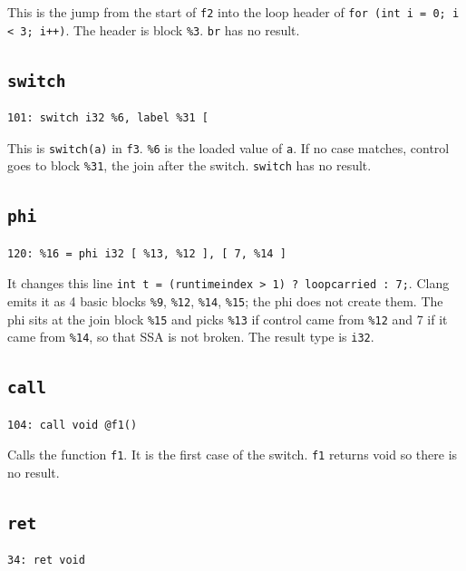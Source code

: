 \documentclass[11pt,a4paper]{article}
\begin{document}
This is the jump from the start of \texttt{f2} into the loop header of
\texttt{for (int i = 0; i < 3; i++)}. The header is block \texttt{\%3}.
\texttt{br} has no result.

\subsection*{\texttt{switch}}

\begin{lstlisting}
101: switch i32 %6, label %31 [
\end{lstlisting}

This is \texttt{switch(a)} in \texttt{f3}. \texttt{\%6} is the loaded
value of \texttt{a}. If no case matches, control goes to block
\texttt{\%31}, the join after the switch. \texttt{switch} has no result.

\subsection*{\texttt{phi}}

\begin{lstlisting}
120: %16 = phi i32 [ %13, %12 ], [ 7, %14 ]
\end{lstlisting}

It changes this line \texttt{int t = (runtimeindex > 1) ? loopcarried : 7;}.
Clang emits it as 4 basic blocks \texttt{\%9}, \texttt{\%12}, \texttt{\%14}, \texttt{\%15}; the phi
does not create them. The phi sits at the join block \texttt{\%15} and picks \texttt{\%13}
if control came from \texttt{\%12} and 7 if it came from \texttt{\%14}, so that SSA is not
broken. The result type is \texttt{i32}.

\subsection*{\texttt{call}}

\begin{lstlisting}
104: call void @f1()
\end{lstlisting}

Calls the function \texttt{f1}. It is the first case of the switch. \texttt{f1}
returns void so there is no result.

\subsection*{\texttt{ret}}

\begin{lstlisting}
34: ret void
\end{lstlisting}
\end{document}
